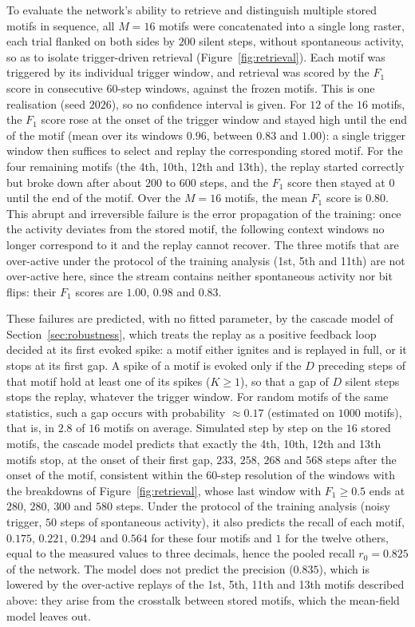 \documentclass{scrartcl}
\begin{document}
To evaluate the network's ability to retrieve and distinguish multiple stored motifs in sequence, all $M=16$ motifs were concatenated into a single long raster, each trial flanked on both sides by $200$ silent steps, without spontaneous activity, so as to isolate trigger-driven retrieval (Figure~\ref{fig:retrieval}). Each motif was triggered by its individual trigger window, and retrieval was scored by the $F_1$ score in consecutive $60$-step windows, against the frozen motifs. This is one realisation (seed $2026$), so no confidence interval is given. For $12$ of the $16$ motifs, the $F_1$ score rose at the onset of the trigger window and stayed high until the end of the motif (mean over its windows $0.96$, between $0.83$ and $1.00$): a single trigger window then suffices to select and replay the corresponding stored motif. For the four remaining motifs (the 4th, 10th, 12th and 13th), the replay started correctly but broke down after about $200$ to $600$ steps, and the $F_1$ score then stayed at $0$ until the end of the motif. Over the $M=16$ motifs, the mean $F_1$ score is $0.80$. This abrupt and irreversible failure is the error propagation of the training: once the activity deviates from the stored motif, the following context windows no longer correspond to it and the replay cannot recover. The three motifs that are over-active under the protocol of the training analysis (1st, 5th and 11th) are not over-active here, since the stream contains neither spontaneous activity nor bit flips: their $F_1$ scores are $1.00$, $0.98$ and $0.83$.

These failures are predicted, with no fitted parameter, by the cascade model of Section~\ref{sec:robustness}, which treats the replay as a positive feedback loop decided at its first evoked spike: a motif either ignites and is replayed in full, or it stops at its first gap. A spike of a motif is evoked only if the $D$ preceding steps of that motif hold at least one of its spikes ($K \geq 1$), so that a gap of $D$ silent steps stops the replay, whatever the trigger window. For random motifs of the same statistics, such a gap occurs with probability $\approx 0.17$ (estimated on $1000$ motifs), that is, in $2.8$ of $16$ motifs on average. Simulated step by step on the $16$ stored motifs, the cascade model predicts that exactly the 4th, 10th, 12th and 13th motifs stop, at the onset of their first gap, $233$, $258$, $268$ and $568$ steps after the onset of the motif, consistent within the $60$-step resolution of the windows with the breakdowns of Figure~\ref{fig:retrieval}, whose last window with $F_1 \geq 0.5$ ends at $280$, $280$, $300$ and $580$ steps. Under the protocol of the training analysis (noisy trigger, $50$ steps of spontaneous activity), it also predicts the recall of each motif, $0.175$, $0.221$, $0.294$ and $0.564$ for these four motifs and $1$ for the twelve others, equal to the measured values to three decimals, hence the pooled recall $r_0 = 0.825$ of the network. The model does not predict the precision ($0.835$), which is lowered by the over-active replays of the 1st, 5th, 11th and 13th motifs described above: they arise from the crosstalk between stored motifs, which the mean-field model leaves out.
\end{document}
